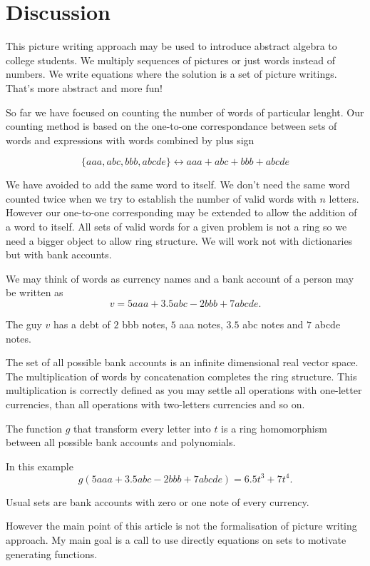 \documentclass{article}
\begin{document}
\section{Discussion}


This picture writing approach may be used to introduce abstract algebra to college students. 
We multiply sequences of pictures or just words instead of numbers. 
We write equations where the solution is a set of picture writings. 
That's more abstract and more fun!

So far we have focused on counting the number of words of particular lenght. 
Our counting method is based on the one-to-one correspondance between sets of words and expressions with words combined by plus sign

\[
\{ aaa, abc, bbb, abcde \}  \leftrightarrow aaa + abc + bbb + abcde
\]

We have avoided to add the same word to itself. 
We don't need the same word counted twice when we try to establish the number of valid words with $n$ letters. 
However our one-to-one corresponding may be extended to allow the addition of a word to itself. 
All sets of valid words for a given problem is not a ring so we need a bigger object to allow ring structure.
We will work not with dictionaries but with bank accounts. 

We may think of words as currency names and a bank account of a person may be written as
\[
v = 5 aaa + 3.5 abc - 2 bbb + 7 abcde.
\]

The guy $v$ has a debt of $2$ bbb notes, $5$ aaa notes, $3.5$ abc notes and $7$ abcde notes.

The set of all possible bank accounts is an infinite dimensional real vector space. 
The multiplication of words by concatenation completes the ring structure. 
This multiplication is correctly defined as you may settle all operations with one-letter currencies, 
than all operations with two-letters currencies and so on.

The function $g$ that transform every letter into $t$ is a ring homomorphism between all possible bank accounts and polynomials. 

In this example
\[
g(5 aaa + 3.5 abc - 2 bbb + 7 abcde) = 6.5 t^3  + 7 t^4.
\]

Usual sets are bank accounts with zero or one note of every currency. 

However the main point of this article is not the formalisation of picture writing approach.
My main goal is a call to use directly equations on sets to motivate generating functions. 
\end{document}
